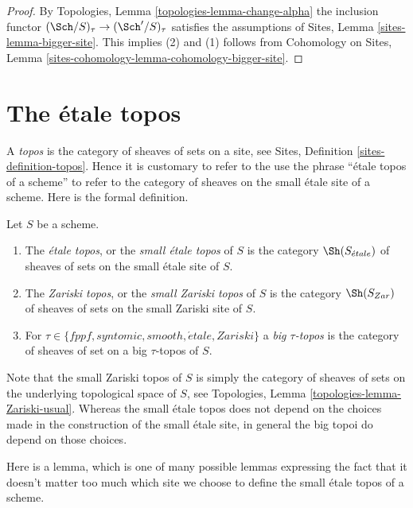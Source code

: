 \begin{proof}
By Topologies, Lemma \ref{topologies-lemma-change-alpha} the inclusion functor
$(\Sch/S)_\tau \to (\Sch'/S)_\tau$ satisfies the assumptions of
Sites, Lemma \ref{sites-lemma-bigger-site}. This implies (2) and (1)
follows from
Cohomology on Sites, Lemma \ref{sites-cohomology-lemma-cohomology-bigger-site}.
\end{proof}




\section{The \'etale topos}
\label{section-etale-topos}

\noindent
A {\it topos} is the category of sheaves of sets on a site, see
Sites, Definition \ref{sites-definition-topos}. Hence it is customary
to refer to the use the phrase ``\'etale topos of a scheme'' to refer to
the category of sheaves on the small \'etale site of a scheme.
Here is the formal definition.

\begin{definition}
\label{definition-etale-topos}
Let $S$ be a scheme.
\begin{enumerate}
\item The {\it \'etale topos}, or the {\it small \'etale topos}
of $S$ is the category $\Sh(S_{\acute{e}tale})$ of sheaves of sets on
the small \'etale site of $S$.
\item The {\it Zariski topos}, or the {\it small Zariski topos}
of $S$ is the category $\Sh(S_{Zar})$ of sheaves of sets on the
small Zariski site of $S$.
\item For $\tau \in \{fppf, syntomic, smooth, \acute{e}tale, Zariski\}$ a
{\it big $\tau$-topos} is the category of sheaves of set on a
big $\tau$-topos of $S$.
\end{enumerate}
\end{definition}

\noindent
Note that the small Zariski topos of $S$ is simply the category of sheaves
of sets on the underlying topological space of $S$, see
Topologies, Lemma \ref{topologies-lemma-Zariski-usual}.
Whereas the small \'etale topos does not depend on the choices made in the
construction of the small \'etale site, in general the big topoi do depend
on those choices.

\medskip\noindent
Here is a lemma, which is one of many possible lemmas expressing the
fact that it doesn't matter too much which site we choose to define
the small \'etale topos of a scheme.

